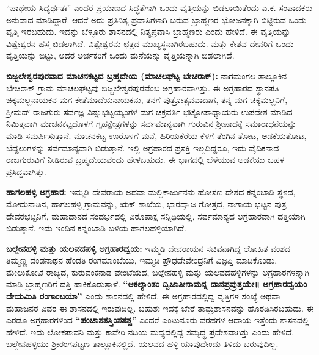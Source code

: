 “ಪಾಥೇಯ ಸಿದ್ಯರ್ಥತಃ” ಎಂದರೆ ಪ್ರಯಾಣದ ಸಿದ್ಧತೆಗಾಗಿ ಒಂದು ವೃತ್ತಿಯನ್ನು ಬಿಡಲಾಯಿತೆಂದು ಎ.ಕ. ಸಂಪಾದಕರು ಅನುವಾದ ಮಾಡಿದ್ದಾರೆ. ಆದರೆ ಅದು ಪ್ರತಿನಿತ್ಯ ಪ್ರವಾಸಿಗಳಾಗಿ ಬರುವ ಬ್ರಾಹ್ಮಣರ ಭೋಜನಕ್ಕಾಗಿ ಬಿಟ್ಟಿರುವ ಒಂದು ವೃತ್ತಿ ಇರಬಹುದು. ಇದನ್ನು ಬೆಳ್ಳೂರು ಶಾಸನದಲ್ಲಿ ನಿತ್ಯಪ್ರವಾಸಿ ಬ್ರಾಹ್ಮಣರು ಎಂದು ಹೇಳಿದೆ. ಈ ವೃತ್ತಿಯನ್ನು ವಿಶ್ವೇಶ್ವರನ ಹಸ್ತ ಬಿಡಲಾಗಿದೆ. ವಿಶ್ವೇಶ್ವರನು ಛತ್ರದ ಮುಖ್ಯಸ್ಥನಾಗಿರಬಹುದು. ಮತ್ತು ಕೇಶವ ದೇವರಿಗೆ ಒಂದು ವೃತ್ತಿಯನ್ನು ಬಿಟ್ಟು, ಅದರ ಅರ್ಚಕರಿಗೆ ಒಂದು ಮನೆಯನ್ನು ವೃತ್ತಿಯನ್ನಾಗಿ ಬಿಡಲಾಗಿದೆ.

\textbf{ಬಿಜ್ಜಲೇಶ್ವರಪುರವಾದ ಮಾಚನಕಟ್ಟದ ಬ್ರಹ್ಮದೇಯ (ಮಾಚಲಘಟ್ಟ \enginline{-} ಬೇಚಿರಾಕ್​):} ನಾಗಮಂಗಲ ತಾಲ್ಲೂಕಿನ ಬೇಚಿರಾಕ್​ ಗ್ರಾಮ ಮಾಚಲಘಟ್ಟವು ಬಿಜ್ಜಲೇಶ್ವರಪುರವೆಂಬ ಅಗ್ರಹಾರವಾಗಿತ್ತು. ಈ ಅಗ್ರಹಾರದ ಸ್ಥಾನಪತಿ ಚಿಕ್ಕಮಲ್ಲನಾಯಕನ ಮಗ ಕೇತೆಮಾದೆಯನಾಯಕನು, ತನಗೆ ಪುತ್ರೋತ್ಸವವಾದಾಗ, ತನ್ನ ಮಗ ಚಿಕ್ಕಮಲ್ಲನಿಗೆ, ಶ‍್ರೀಮದ್​ ರಾಜಗುರು ಸರ್ವಜ್ಞ ವಿಷ್ಣುಭಟ್ಟಯ್ಯಂಗಳ ಮಗ ಚಕ್ರವರ್ತಿ ಭಟ್ಟೋಪಾಧ್ಯಾಯರು ಉಪದೇಶ ಮಾಡಿದ ನಿಮಿತ್ತವಾಗಿ ಮಾಚನಕಟ್ಟದೊಳಗೆ ಗೃಹಕ್ಷೇತ್ರಗಳನ್ನು ಸರ್ವಮಾನ್ಯವಾಗಿ ಗುರುವಿನ ಶ‍್ರೀಪಾದಕ್ಕೆ ಸಮಾರಾಧನೆಯನ್ನು ಮಾಡಿ ಸಮರ್ಪಿಸುತ್ತಾನೆ. ಮಾಚನಕಟ್ಟ ಊರೊಳಗೆ ಮನೆ, ಹಿರಿಯಕೆರೆಯ ಕೆಳಗೆ ತೆಂಗಿನ ತೋಟ, ಅಡಕೆಯತೋಟ, ಬೆದ್ದಲುಗಳನ್ನು ಸರ್ವಮಾನ್ಯವಾಗಿ ಬಿಡುತ್ತಾನೆ. ಇಲ್ಲಿ ಅಗ್ರಹಾರದ ಪ್ರಸಕ್ತಿ ಇಲ್ಲದಿದ್ದರೂ, ಇದು ವೈದಿಕನಾದ ರಾಜಗುರುವಿಗೆ ನೀಡಿರುವ ಬ್ರಹ್ಮದೇಯವೆಂದು ಹೇಳಬಹುದು. ಈ ಭಾಗದಲ್ಲಿ ಬೆಳೆಯುವ ಅಡಕೆಯು ಬಹಳ ಪ್ರಸಿದ್ಧವಾಗಿತ್ತು.

\textbf{ಹಾಗಲಹಳ್ಳಿ ಅಗ್ರಹಾರ:} ಇಮ್ಮಡಿ ದೇವರಾಯ ಅಥವಾ ಮಲ್ಲಿಕಾರ್ಜುನನು ಹೋಸಣ ದೇಶದ ಕನ್ನಂಬಾಡಿ ಸ್ಥಳದ, ಮೋದುನಾಡಿನ, ಹಾಗಲಹಳ್ಳಿ ಗ್ರಾಮವನ್ನು, ಋಕ್​ ಶಾಖೆಯ, ಭಾರದ್ವಾಜ ಗೋತ್ರದ, ನಾಗಾಯ ಭಟ್ಟನ ಪುತ್ರ ದೇವರಭಟ್ಟನಿಗೆ, ಮಹಾದಾನದ ಸಂದರ್ಭದಲ್ಲಿ ವಿರೂಪಾಕ್ಷ ಸನ್ನಿಧಿಯಲ್ಲಿ, ಸರ್ವಮಾನ್ಯದ ಅಗ್ರಹಾರವಾಗಿ ದತ್ತಿಯಾಗಿ ಬಿಡುತ್ತಾನೆ. ಇದು ಇಂದಿನ ಕನ್ನಂಬಾಡಿ ಬಳಿಯ ಹಾಗಲಹಳ್ಳಿಯಾಗಿದೆ.

\textbf{ಬಲ್ಲೇನಹಳ್ಳಿ ಮತ್ತು ಯಲವದಪಳ್ಳಿ ಅಗ್ರಹಾರದ್ವಯ: } ಇಮ್ಮಡಿ ದೇವರಾಯನ ಸಚಿವನಾಗಿದ್ದ ಲೋಹಿತ ವಂಶದ ತಿಮ್ಮಣ್ಣ ದಂಡನಾಥನ ಹೆಂಡತಿ ರಂಗಮಾಂಬೆಯು, ಇಮ್ಮಡಿ ಪ್ರೌಢದೇವೇಂದ್ರನಿಗೆ ವಿಜ್ಞಪ್ತಿ ಮಾಡಿಕೊಂಡು, ಮೇಲುಕೋಟೆ ರಾಜ್ಯದ, ಕುರುವಂಕನಾಡ ವೇಂಟೆಯದ, ಬಲ್ಲೇನಹಳ್ಳಿ ಮತ್ತು ಯಲವದಹಳ್ಳಿಗಳನ್ನು ಅಗ್ರಹಾರಗಳನ್ನಾಗಿ ಮಾಡಿ ಬ್ರಾಹ್ಮಣರಿಗೆ ದತ್ತಿ ಹಾಕಿಕೊಡುತ್ತಾಳೆ. \textbf{“ಆಕಲ್ಯಾಂತಂ ದ್ವಿಜಾತೀನಾಮನ್ನ ದಾನಪ್ರವ್ರುತ್ತಯೇ॥ ಅಗ್ರಹಾರದ್ವಯಂ ದೇಯಮಿತಿ ರಂಗಾಂಬಯಾ”} ಎಂದು ಶಾಸನದಲ್ಲಿ ಹೇಳಿದೆ. ಈ ಅಗ್ರಹಾರದಲ್ಲಿದ್ದ ವೃತ್ತಿಗಳ ಸಂಖ್ಯೆ ಅಥವಾ ಮಹಾಜನರ ವಿವರ ಈ ಶಾಸನದಲ್ಲಿ ಇರುವುದಿಲ್ಲ. ಬಹುಶಃ ಇದಕ್ಕೆ ಬೇರೆ ತಾಮ್ರಶಾಸನವನ್ನು ಹೊರಡಿಸಿರಬಹುದು. ಈ ಎರಡೂ ಅಗ್ರಹಾರಗಳಿಂದ \textbf{“ಪಂಚಾಶತಸ್ತ್ರಿಂಶತಶ್ಚ”} ಎಂದರೆ ಎಂಟುನೂರು ವರಹಗಳ ಆದಾಯ ಇತ್ತೆಂದು ಶಾಸನದಲ್ಲಿ ಹೇಳಿದೆ. ಇದು ಲೋಕಪಾವನಿ ಮತ್ತು ಕಾವೇರಿ ನದಿಯ ಮಧ್ಯದಲ್ಲಿದ್ದ ಸಮೃದ್ಧ ಪ್ರದೇಶವಾಗಿತ್ತು ಎಂದು ಹೇಳಿದೆ. ಬಲ್ಲೇನಹಳ್ಳಿಯು ಶ‍್ರೀರಂಗಪಟ್ಟಣ ತಾಲ್ಲೂಕಿನಲ್ಲಿದೆ. ಯಲವದ ಹಳ್ಳಿ ಯಾವುದೇಂದು ತಿಳಿದು ಬರುವುದಿಲ್ಲ.

